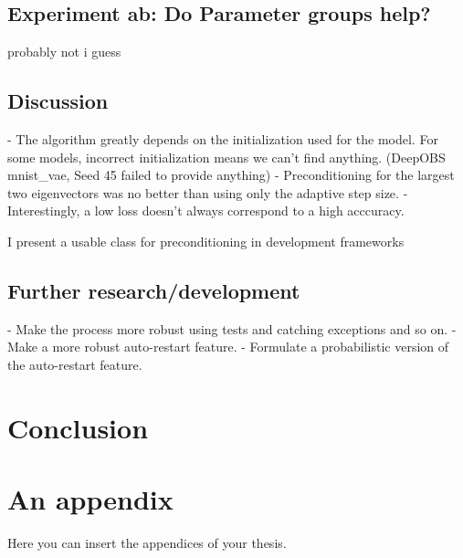 \documentclass[twoside,12pt,a4paper]{report}
\begin{document}
\section{Experiment ab: Do Parameter groups help?}
probably not i guess



\section{Discussion}
\begin{markdown}
- The algorithm greatly depends on the initialization used for the model. For some models, incorrect initialization means we can't find anything. (DeepOBS mnist\_vae, Seed 45 failed to provide anything)
- Preconditioning for the largest two eigenvectors was no better than using only the adaptive step size.
- Interestingly, a low loss doesn't always correspond to a high acccuracy.


\end{markdown}

I present a usable class for preconditioning in development frameworks 
\section{Further research/development}
\begin{markdown}
- Make the process more robust using tests and catching exceptions and so on.
- Make a more robust auto-restart feature.
- Formulate a probabilistic version of the auto-restart feature.
\end{markdown}



\chapter{Conclusion}

\appendix %
\chapter{An appendix}
Here you can insert the appendices of your thesis.



\end{document}
